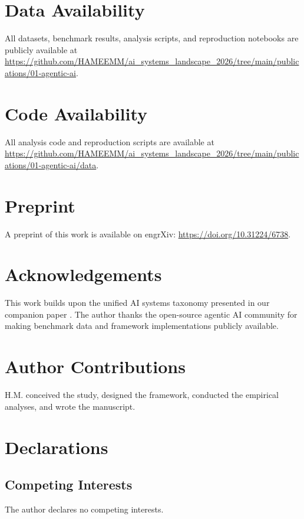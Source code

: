 \documentclass[sn-basic]{sn-jnl}
\theoremstyle{definition}
\begin{document}
\backmatter

\section*{Data Availability}

All datasets, benchmark results, analysis scripts, and reproduction notebooks are publicly available at \url{https://github.com/HAMEEMM/ai_systems_landscape_2026/tree/main/publications/01-agentic-ai}.

\section*{Code Availability}

All analysis code and reproduction scripts are available at \url{https://github.com/HAMEEMM/ai_systems_landscape_2026/tree/main/publications/01-agentic-ai/data}.

\section*{Preprint}

A preprint of this work is available on engrXiv: \url{https://doi.org/10.31224/6738}.

\section*{Acknowledgements}

This work builds upon the unified AI systems taxonomy presented in our companion paper \citep{mahdi2026taxonomy}. The author thanks the open-source agentic AI community for making benchmark data and framework implementations publicly available.

\section*{Author Contributions}

H.M. conceived the study, designed the framework, conducted the empirical analyses, and wrote the manuscript.

\section*{Declarations}

\subsection*{Competing Interests}
The author declares no competing interests.
\end{document}
